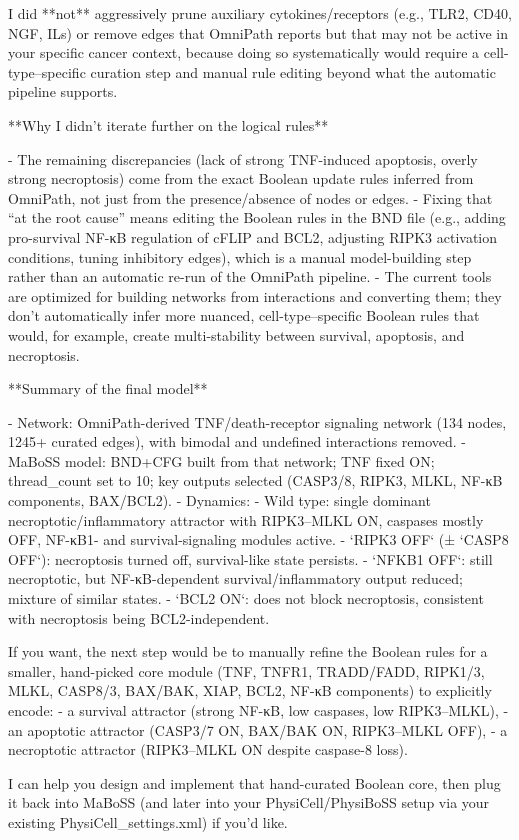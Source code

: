 \documentclass[11pt,a4paper]{article}
\begin{document}
\begin{copilotbox}
I did **not** aggressively prune auxiliary cytokines/receptors (e.g., TLR2, CD40, NGF, ILs) or remove edges that OmniPath reports but that may not be active in your specific cancer context, because doing so systematically would require a cell-type–specific curation step and manual rule editing beyond what the automatic pipeline supports.

**Why I didn’t iterate further on the logical rules**

- The remaining discrepancies (lack of strong TNF-induced apoptosis, overly strong necroptosis) come from the exact Boolean update rules inferred from OmniPath, not just from the presence/absence of nodes or edges.
- Fixing that “at the root cause” means editing the Boolean rules in the BND file (e.g., adding pro-survival NF-κB regulation of cFLIP and BCL2, adjusting RIPK3 activation conditions, tuning inhibitory edges), which is a manual model-building step rather than an automatic re-run of the OmniPath pipeline.
- The current tools are optimized for building networks from interactions and converting them; they don’t automatically infer more nuanced, cell-type–specific Boolean rules that would, for example, create multi-stability between survival, apoptosis, and necroptosis.

**Summary of the final model**

- Network: OmniPath-derived TNF/death-receptor signaling network (134 nodes, 1245+ curated edges), with bimodal and undefined interactions removed.
- MaBoSS model: BND+CFG built from that network; TNF fixed ON; thread\_count set to 10; key outputs selected (CASP3/8, RIPK3, MLKL, NF-κB components, BAX/BCL2).
- Dynamics:
  - Wild type: single dominant necroptotic/inflammatory attractor with RIPK3–MLKL ON, caspases mostly OFF, NF-κB1- and survival-signaling modules active.
  - `RIPK3 OFF` (± `CASP8 OFF`): necroptosis turned off, survival-like state persists.
  - `NFKB1 OFF`: still necroptotic, but NF-κB-dependent survival/inflammatory output reduced; mixture of similar states.
  - `BCL2 ON`: does not block necroptosis, consistent with necroptosis being BCL2-independent.

If you want, the next step would be to manually refine the Boolean rules for a smaller, hand-picked core module (TNF, TNFR1, TRADD/FADD, RIPK1/3, MLKL, CASP8/3, BAX/BAK, XIAP, BCL2, NF-κB components) to explicitly encode:
- a survival attractor (strong NF-κB, low caspases, low RIPK3–MLKL),
- an apoptotic attractor (CASP3/7 ON, BAX/BAK ON, RIPK3–MLKL OFF),
- a necroptotic attractor (RIPK3–MLKL ON despite caspase-8 loss).

I can help you design and implement that hand-curated Boolean core, then plug it back into MaBoSS (and later into your PhysiCell/PhysiBoSS setup via your existing PhysiCell\_settings.xml) if you’d like.

\end{copilotbox}
\end{document}
